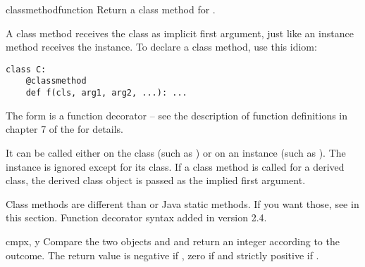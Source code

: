 \begin{funcdesc}{classmethod}{function}
  Return a class method for .

  A class method receives the class as implicit first argument,
  just like an instance method receives the instance.
  To declare a class method, use this idiom:

\begin{verbatim}
class C:
    @classmethod
    def f(cls, arg1, arg2, ...): ...
\end{verbatim}

  The  form is a function decorator -- see the description
  of function definitions in chapter 7 of the
   for details.

  It can be called either on the class (such as ) or on an
  instance (such as ).  The instance is ignored except for
  its class.
  If a class method is called for a derived class, the derived class
  object is passed as the implied first argument.

  Class methods are different than \Cpp{} or Java static methods.
  If you want those, see  in this section.
  Function decorator syntax added in version 2.4.
\end{funcdesc}

\begin{funcdesc}{cmp}{x, y}
  Compare the two objects  and  and return an integer
  according to the outcome.  The return value is negative if , zero if  and strictly positive if
  .
\end{funcdesc}

